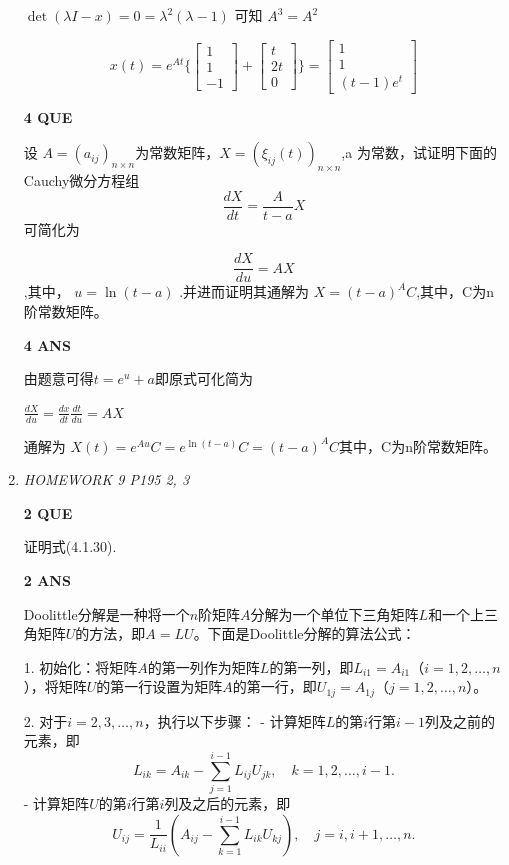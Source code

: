 \documentclass[11pt,letterpaper]{ctexart}
\begin{document}
\begin{enumerate}
$\det(\lambda I - x) = 0 = \lambda^2(\lambda - 1)$ 可知 $A^3 = A^2$


\[x(t) = e^{At} \{ \begin{bmatrix} 1 \\ 1 \\ -1 \end{bmatrix} + \begin{bmatrix} t \\ 2t \\ 0 \end{bmatrix} \}  = \begin{bmatrix}
	1 \\ 1 \\ (t - 1)e^t
\end{bmatrix}\]


\textbf{4 QUE}
\bigskip

设 $A = (a_{ij})_{n \times n}$为常数矩阵，$X = (\xi_{ij}(t))_{n \times n}$,a 为常数，试证明下面的Cauchy微分方程组
\[ \frac{dX}{dt} = \frac{A}{t - a}X\]可简化为

\[\frac{dX}{du} = AX\],其中， $u = \ln(t - a)$ .并进而证明其通解为 $X = (t - a)^AC$,其中，C为n阶常数矩阵。


\textbf{4 ANS}
\bigskip

由题意可得$t = e^u + a$即原式可化简为

$\frac{dX}{du} = \frac{dx}{dt}\frac{dt}{du} = AX$

通解为 $X(t) = e^{Au}C = e^{\ln(t - a)}C = (t - a)^A C$其中，C为n阶常数矩阵。


\item \textit{HOMEWORK 9 {P195 2, 3}}%

\textbf{2 QUE}
\bigskip

证明式(4.1.30).

\textbf{2 ANS}
\bigskip

Doolittle分解是一种将一个$n$阶矩阵$A$分解为一个单位下三角矩阵$L$和一个上三角矩阵$U$的方法，即$A = LU$。下面是Doolittle分解的算法公式：

1. 初始化：将矩阵$A$的第一列作为矩阵$L$的第一列，即$L_{i1} = A_{i1}$（$i=1,2,\ldots,n$），将矩阵$U$的第一行设置为矩阵$A$的第一行，即$U_{1j} = A_{1j}$（$j=1,2,\ldots,n$）。

2. 对于$i=2,3,\ldots,n$，执行以下步骤：
   - 计算矩阵$L$的第$i$行第$i-1$列及之前的元素，即
     $$
     L_{ik} = A_{ik} - \sum_{j=1}^{i-1} L_{ij}U_{jk},\quad k=1,2,\ldots,i-1.
     $$
   - 计算矩阵$U$的第$i$行第$i$列及之后的元素，即
     $$
     U_{ij} = \frac{1}{L_{ii}} \left(A_{ij} - \sum_{k=1}^{i-1} L_{ik}U_{kj}\right),\quad j=i,i+1,\ldots,n.
     $$


\end{enumerate}
\end{document}
